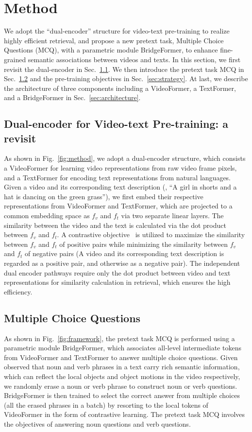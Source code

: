 \documentclass[10pt,twocolumn,letterpaper]{article}
\begin{document}
\section{Method}
We adopt the ``dual-encoder'' structure for video-text pre-training to realize highly efficient retrieval, 
and propose a new pretext task, Multiple Choice Questions (MCQ), with a parametric module BridgeFormer, to enhance fine-grained semantic associations between videos and texts. 
In this section, we first revisit the dual-encoder in Sec.~\ref{sec:revisit }. We then introduce the pretext task MCQ in Sec.~\ref{sec:mcq} and the pre-training objectives in Sec.~\ref{sec:strategy}. At last, we describe the architecture of three components including a VideoFormer, a TextFormer, and a BridgeFormer in Sec.~\ref{sec:architecture}. 

\subsection{Dual-encoder for Video-text Pre-training: a revisit}\label{sec:revisit }
As shown in Fig.~\ref{fig:method}, we adopt a dual-encoder structure, which consists a VideoFormer for learning video representations from raw video frame pixels, and a TextFormer for encoding text representations from natural languages. Given a video and its corresponding text description (\eg, ``A girl in shorts and a hat is dancing on the green grass''), we first embed their respective representations from VideoFormer and TextFormer, which are projected to a common embedding space as $f_v$ and $f_t$ via two separate linear layers.
The similarity between the video and the text is calculated via the dot product between $f_v$ and $f_t$. A contrastive objective~\cite{contrastive1,contrastive2} is utilized to maximize the similarity between $f_v$ and $f_t$ of positive pairs while minimizing the similarity between $f_v$ and $f_t$ of negative pairs (A video and its corresponding text description is regarded as a positive pair, and otherwise as a negative pair). The independent dual encoder pathways require only the dot product between video and text representations for similarity calculation in retrieval, which ensures the high efficiency.



\subsection{Multiple Choice Questions}\label{sec:mcq}
As shown in Fig.~\ref{fig:framework}, the pretext task MCQ is performed using a parametric module BridgeFormer, which associates all-level intermediate tokens from VideoFormer and TextFormer to answer multiple choice questions. Given observed that noun and verb phrases in a text carry rich semantic information, which can reflect the local objects and object motions in the video respectively, we randomly erase a noun or verb phrase to construct noun or verb questions. BridgeFormer is then trained to select the correct answer from multiple choices (all the erased phrases in a batch) by resorting to the local tokens of VideoFormer in the form of contrastive learning. The pretext task MCQ involves the objectives of answering noun questions and verb questions.
\end{document}
